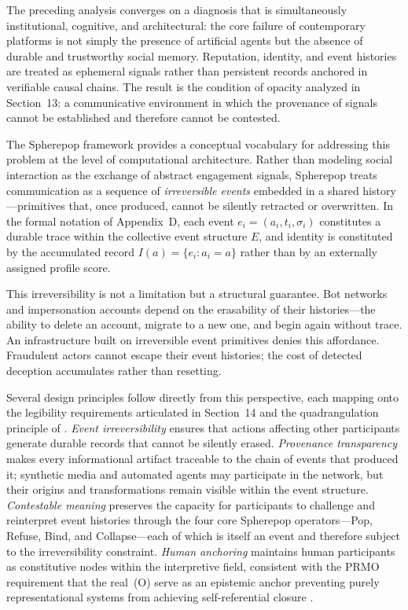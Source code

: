 \documentclass[12pt,a4paper]{article}
\begin{document}
The preceding analysis converges on a diagnosis that is simultaneously institutional,
cognitive, and architectural: the core failure of contemporary platforms is not simply the
presence of artificial agents but the absence of durable and trustworthy social memory.
Reputation, identity, and event histories are treated as ephemeral signals rather than
persistent records anchored in verifiable causal chains. The result is the condition of opacity
analyzed in Section~13: a communicative environment in which the provenance of signals cannot
be established and therefore cannot be contested.

The Spherepop framework provides a conceptual vocabulary for addressing this problem at the
level of computational architecture. Rather than modeling social interaction as the exchange
of abstract engagement signals, Spherepop treats communication as a sequence of
\emph{irreversible events} embedded in a shared history---primitives that, once produced,
cannot be silently retracted or overwritten. In the formal notation of Appendix~D, each event
$e_i = (a_i, t_i, \sigma_i)$ constitutes a durable trace within the collective event structure
$E$, and identity is constituted by the accumulated record $I(a) = \{e_i : a_i = a\}$ rather
than by an externally assigned profile score.

This irreversibility is not a limitation but a structural guarantee. Bot networks and
impersonation accounts depend on the erasability of their histories---the ability to delete an
account, migrate to a new one, and begin again without trace. An infrastructure built on
irreversible event primitives denies this affordance. Fraudulent actors cannot escape their
event histories; the cost of detected deception accumulates rather than resetting.

Several design principles follow directly from this perspective, each mapping onto the
legibility requirements articulated in Section~14 and the quadrangulation principle of
\citet{jelinek2026}. \emph{Event irreversibility} ensures that actions affecting other
participants generate durable records that cannot be silently erased. \emph{Provenance
transparency} makes every informational artifact traceable to the chain of events that produced
it; synthetic media and automated agents may participate in the network, but their origins and
transformations remain visible within the event structure. \emph{Contestable meaning} preserves
the capacity for participants to challenge and reinterpret event histories through the four core
Spherepop operators---Pop, Refuse, Bind, and Collapse---each of which is itself an event and
therefore subject to the irreversibility constraint. \emph{Human anchoring} maintains human
participants as constitutive nodes within the interpretive field, consistent with the PRMO
requirement that the real~(O) serve as an epistemic anchor preventing purely representational
systems from achieving self-referential closure \citep{jelinek2026}.
\end{document}
